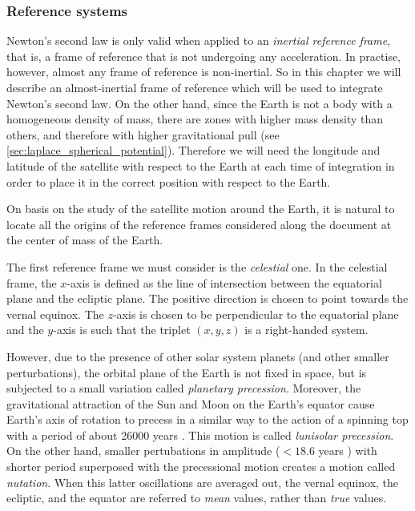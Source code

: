 \documentclass[../main.tex]{subfiles}
\begin{document}
\subsubsection{Reference systems}\label{sec:reference_systems}
Newton's second law is only valid when applied to an \emph{inertial reference frame}, that is, a frame of reference that is not undergoing any acceleration. In practise, however, almost any frame of reference is non-inertial. So in this chapter we will describe an almost-inertial frame of reference which will be used to integrate Newton's second law. On the other hand, since the Earth is not a body with a homogeneous density of mass, there are zones with higher mass density than others, and therefore with higher gravitational pull (see \cref{sec:laplace_spherical_potential}). Therefore we will need the longitude and latitude of the satellite with respect to the Earth at each time of integration in order to place it in the correct position with respect to the Earth.

On basis on the study of the satellite motion around the Earth, it is natural to locate all the origins of the reference frames considered along the document at the center of mass of the Earth.

The first reference frame we must consider is the \emph{celestial} one. In the celestial frame, the $x$-axis is defined as the line of intersection between the equatorial plane and the ecliptic plane. The positive direction is chosen to point towards the vernal equinox. The $z$-axis is chosen to be perpendicular to the equatorial plane and the $y$-axis is such that the triplet $(x,y,z)$ is a right-handed system.

However, due to the presence of other solar system planets (and other smaller perturbations), the orbital plane of the Earth is not fixed in space, but is subjected to a small variation called \emph{planetary precession}. Moreover, the gravitational attraction of the Sun and Moon on the Earth's equator cause Earth's axis of rotation to precess in a similar way to the action of a spinning top with a period of about 26000 years \cite{montenbruck}. This motion is called \emph{lunisolar precession}. On the other hand, smaller pertubations in amplitude ($<18.6$ years \cite{wiki:eci}) with shorter period superposed with the precessional motion creates a motion called \emph{nutation}. When this latter oscillations are averaged out, the vernal equinox, the ecliptic, and the equator are referred to \emph{mean} values, rather than \emph{true} values.
\end{document}
